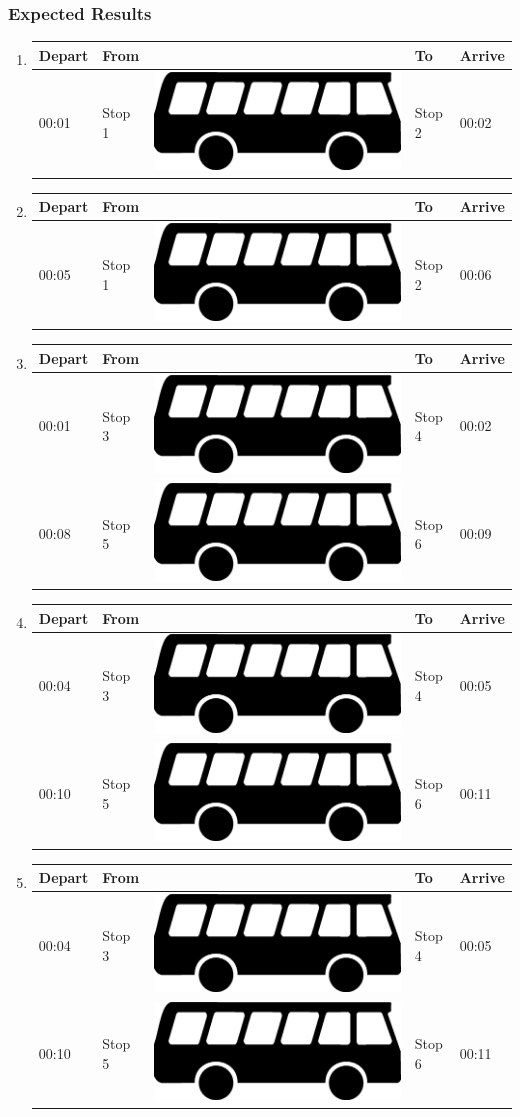 \documentclass[a4paper,11pt]{article}
\newcommand*{\bus}{\includegraphics[scale=0.02]{img/bus}}
\begin{document}
\begin{enumerate}
\begin{enumerate}
\subsubsection*{Expected Results}
\begin{enumerate}
\item
{\scriptsize
\begin{tabular}{p{.75cm} | p{3.0cm} c p{3.0cm} | p{.75cm} }
\hline
\rowcolor{Gray}
Depart & From & & To & Arrive \\
\hline
00:01 & Stop 1 & \bus & Stop 2 & 00:02 \\
\hline
\end{tabular}
}
\item
{\scriptsize
\begin{tabular}{p{.75cm} | p{3.0cm} c p{3.0cm} | p{.75cm} }
\hline
\rowcolor{Gray}
Depart & From & & To & Arrive \\
\hline
00:05 & Stop 1 & \bus & Stop 2 & 00:06 \\
\hline
\end{tabular}
}
\item
{\scriptsize
\begin{tabular}{p{.75cm} | p{3.0cm} c p{3.0cm} | p{.75cm} }
\hline
\rowcolor{Gray}
Depart & From & & To & Arrive \\
\hline
00:01 & Stop 3 & \bus & Stop 4 & 00:02 \\
\hline
00:08 & Stop 5 & \bus & Stop 6 & 00:09 \\
\hline
\end{tabular}
}
\item
{\scriptsize
\begin{tabular}{p{.75cm} | p{3.0cm} c p{3.0cm} | p{.75cm} }
\hline
\rowcolor{Gray}
Depart & From & & To & Arrive \\
\hline
00:04 & Stop 3 & \bus & Stop 4 & 00:05 \\
\hline
00:10 & Stop 5 & \bus & Stop 6 & 00:11 \\
\hline
\end{tabular}
}
\item
{\scriptsize
\begin{tabular}{p{.75cm} | p{3.0cm} c p{3.0cm} | p{.75cm} }
\hline
\rowcolor{Gray}
Depart & From & & To & Arrive \\
\hline
00:04 & Stop 3 & \bus & Stop 4 & 00:05 \\
\hline
00:10 & Stop 5 & \bus & Stop 6 & 00:11 \\
\hline
\end{tabular}
}
\end{enumerate}
\newpage


\end{enumerate}
\end{enumerate}
\end{document}
